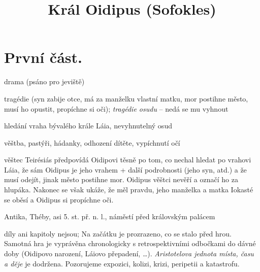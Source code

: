 \documentclass{article}
\title{\vspace{-2cm}Král Oidipus (Sofokles)\vspace{-2cm}}
\date{}
\begin{document}
\maketitle
\section{První část.}
\begin{description}
    \setlength\itemsep{0.15em}
    \item[druh:] drama (psáno pro jeviště)
    \item[žánr:] tragédie (syn zabije otce, má za manželku vlastní matku, mor postihne město, musí ho opustit, propíchne si oči); \textit{tragédie osudu} -- nedá se mu vyhnout
    \item[téma:] hledání vraha bývalého krále Láia, nevyhnutelný osud
    \item[motivy:] věštba, pastýři, hádanky, odhození dítěte, vypíchnutí očí
    \item[zařazení výňatku do kontextu díla:] věštec Teirésiás předpovídá Oidipovi těsně po tom, co nechal hledat po vrahovi Láia, že sám Oidipus je jeho vrahem + další podrobnosti (jeho syn, atd.) a že musí odejít, jinak město postihne mor. Oidipus věštci nevěří a označí ho za hlupáka. Nakonec se však ukáže, že měl pravdu, jeho manželka a matka Iokasté se oběsí a Oidipus si propíchne oči.
    \item[časoprostor:] Antika, Théby, asi 5. st. př. n. l., náměstí před královským palácem
    \item[kompoziční výstavba:] díly ani kapitoly nejsou; Na začátku je prozrazeno, co se stalo před hrou. Samotná hra je vyprávěna chronologicky s retrospektivními odbočkami do dávné doby (Oidipovo narození, Láiovo přepadení, \dots). \textit{Aristotelova jednota místa, času a děje} je dodržena. Pozorujeme expozici, kolizi, krizi, peripetii a katastrofu.
\end{description}
\end{document}
